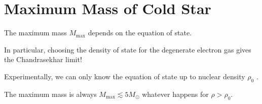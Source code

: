 \section{Maximum Mass of Cold Star}%
\label{sec:maximum_mass_of_cold_star}

The maximum mass $M_{\text{max}}$  depends on the equation of state.
\begin{leftbar}
  In particular, choosing the density of state for the degenerate electron gas gives the Chandrasekhar limit!
\end{leftbar}
\begin{figure}[tbhp]
  \centering
  \def\svgwidth{0.4\columnwidth}
  
  \caption{}
  \label{fig:l2f1}
\end{figure}

Experimentally, we can only know the equation of state up to nuclear density $\rho_0$ .
\begin{claim}
  The maximum mass is always $M_{\text{max}} \lesssim 5 M_\odot$ whatever happens for $\rho > \rho_0$.
\end{claim}
